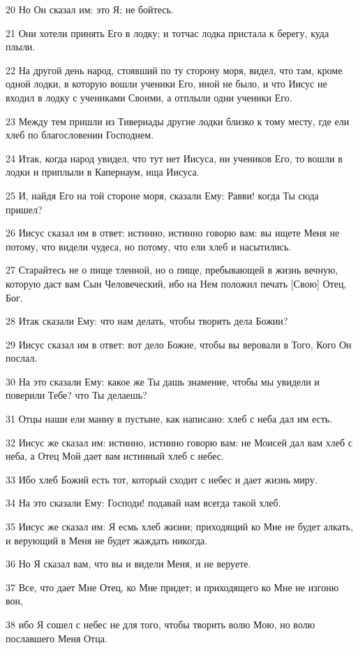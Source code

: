 \par 20 Но Он сказал им: это Я; не бойтесь.
\par 21 Они хотели принять Его в лодку; и тотчас лодка пристала к берегу, куда плыли.
\par 22 На другой день народ, стоявший по ту сторону моря, видел, что там, кроме одной лодки, в которую вошли ученики Его, иной не было, и что Иисус не входил в лодку с учениками Своими, а отплыли одни ученики Его.
\par 23 Между тем пришли из Тивериады другие лодки близко к тому месту, где ели хлеб по благословении Господнем.
\par 24 Итак, когда народ увидел, что тут нет Иисуса, ни учеников Его, то вошли в лодки и приплыли в Капернаум, ища Иисуса.
\par 25 И, найдя Его на той стороне моря, сказали Ему: Равви! когда Ты сюда пришел?
\par 26 Иисус сказал им в ответ: истинно, истинно говорю вам: вы ищете Меня не потому, что видели чудеса, но потому, что ели хлеб и насытились.
\par 27 Старайтесь не о пище тленной, но о пище, пребывающей в жизнь вечную, которую даст вам Сын Человеческий, ибо на Нем положил печать [Свою] Отец, Бог.
\par 28 Итак сказали Ему: что нам делать, чтобы творить дела Божии?
\par 29 Иисус сказал им в ответ: вот дело Божие, чтобы вы веровали в Того, Кого Он послал.
\par 30 На это сказали Ему: какое же Ты дашь знамение, чтобы мы увидели и поверили Тебе? что Ты делаешь?
\par 31 Отцы наши ели манну в пустыне, как написано: хлеб с неба дал им есть.
\par 32 Иисус же сказал им: истинно, истинно говорю вам: не Моисей дал вам хлеб с неба, а Отец Мой дает вам истинный хлеб с небес.
\par 33 Ибо хлеб Божий есть тот, который сходит с небес и дает жизнь миру.
\par 34 На это сказали Ему: Господи! подавай нам всегда такой хлеб.
\par 35 Иисус же сказал им: Я есмь хлеб жизни; приходящий ко Мне не будет алкать, и верующий в Меня не будет жаждать никогда.
\par 36 Но Я сказал вам, что вы и видели Меня, и не веруете.
\par 37 Все, что дает Мне Отец, ко Мне придет; и приходящего ко Мне не изгоню вон,
\par 38 ибо Я сошел с небес не для того, чтобы творить волю Мою, но волю пославшего Меня Отца.
